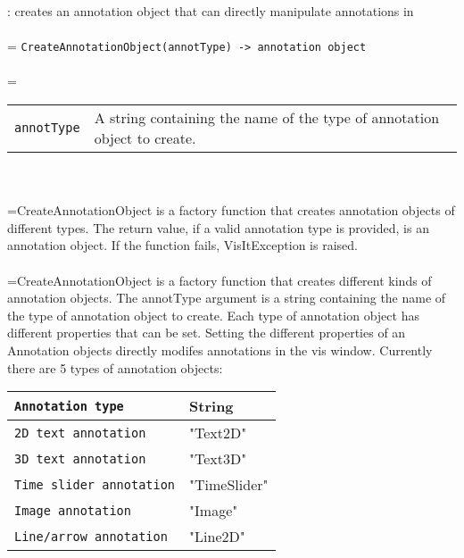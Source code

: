 \documentclass[10pt,a4paper]{report}
\begin{document}
{}
: creates an annotation object that can directly manipulate annotations in\\[-3mm]

 \\ 
\hangindent=\parindent 
\verb!CreateAnnotationObject(annotType) -> annotation object!\\ [-3mm]

 \\ 
\hangindent=\parindent 
\begin{tabular}{lp{9cm}}
\verb!annotType! & A string containing the name of the type of annotation object to create. \\
\end{tabular} \\[-2mm]


 \\ 
\hangindent=\parindent CreateAnnotationObject is a factory function that creates annotation objects of different types. The return value, if a valid annotation type is provided, is an annotation object. If the function fails, VisItException is raised. \\[-3mm] 

 \\ 
\hangindent=\parindent CreateAnnotationObject is a factory function that creates different kinds of annotation objects. The annotType argument is a string containing the name of the type of annotation object to create. Each type of annotation object has different properties that can be set. Setting the different properties of an Annotation objects directly modifes annotations in the vis window. Currently there are 5 types of annotation objects: \\

\begin{tabular}{|l|l|}
\hline
\verb!Annotation type! & String \\
\hline \hline
\verb!2D text annotation! & "Text2D" \\
\verb!3D text annotation! & "Text3D" \\
\verb!Time slider annotation! & "TimeSlider" \\
\verb!Image annotation! & "Image" \\
\verb!Line/arrow annotation! & "Line2D" \\
\hline
\end{tabular} \\[-2mm]
\\[-3mm] 
\end{document}
